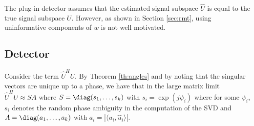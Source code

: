 The plug-in detector assumes that the estimated signal subspace $\widehat{U}$ is equal to the true signal subspace $U$. However, as shown in Section \ref{sec:rmt}, using uninformative components of $w$ is not well motivated.

\subsection{\DIFdelbegin {}\DIFdelend \DIFaddbegin {}\DIFaddend Detector}\label{subsec:optdet}

Consider the term $\widehat{U}^HU$. By Theorem \ref{th:angles} and by noting that the singular vectors are unique up to a phase, we have that in the large matrix limit $\widehat{U}^HU \approx SA$ where $S=\diag(s_1,\dots,s_{k})$ with $s_i=\exp(j \psi_i)$ where for some $\psi_{i}$, $s_i$ denotes the random phase ambiguity in the computation of the SVD and $A=\diag(a_1,\dots,a_k)$ with $a_i=|\langle u_i,\widehat{u}_i\rangle|$.

